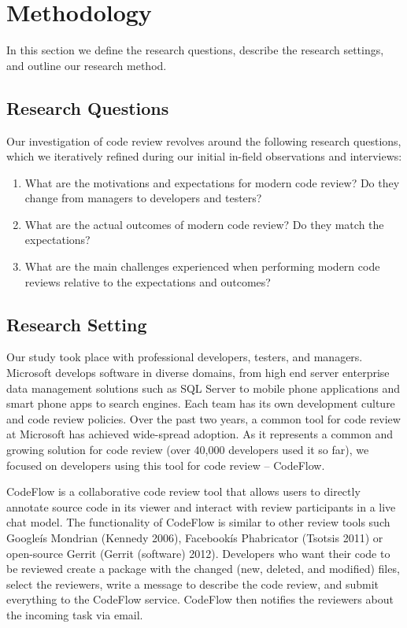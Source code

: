 
\section{Methodology} \label{sec:methodology}


In this section we define the research questions, describe the research
settings, and outline our research method.

\subsection{Research Questions}

Our investigation of code review revolves around the following research
questions, which we iteratively refined during our initial in-field
observations and interviews:

\begin{enumerate}
  \item What are the motivations and expectations for modern code review? Do they change from managers to developers and testers?
  \item What are the actual outcomes of modern code review? Do they match the expectations?
  \item What are the main challenges experienced when performing modern code reviews relative to the expectations and outcomes?
\end{enumerate}

\subsection{Research Setting}

Our study took place with professional developers, testers, and managers.
Microsoft develops software in diverse domains, from high end server enterprise
data management solutions such as SQL Server to mobile phone applications and
smart phone apps to search engines. Each team has its own development culture
and code review policies. Over the past two years, a common tool for code
review at Microsoft has achieved wide-spread adoption. As it represents a
common and growing solution for code review (over 40,000 developers used it so
far), we focused on developers using this tool for code review -- CodeFlow. 

CodeFlow is a collaborative code review tool that allows users to directly
annotate source code in its viewer and interact with review participants in a
live chat model. The functionality of CodeFlow is similar to other review tools
such Googleís Mondrian (Kennedy 2006), Facebookís Phabricator (Tsotsis 2011) or
open-source  Gerrit (Gerrit (software) 2012). Developers who want their code to
be reviewed create a package with the changed (new, deleted, and modified)
files, select the reviewers, write a message to describe the code review, and
submit everything to the CodeFlow service. CodeFlow then notifies the reviewers
about the incoming task via email.

